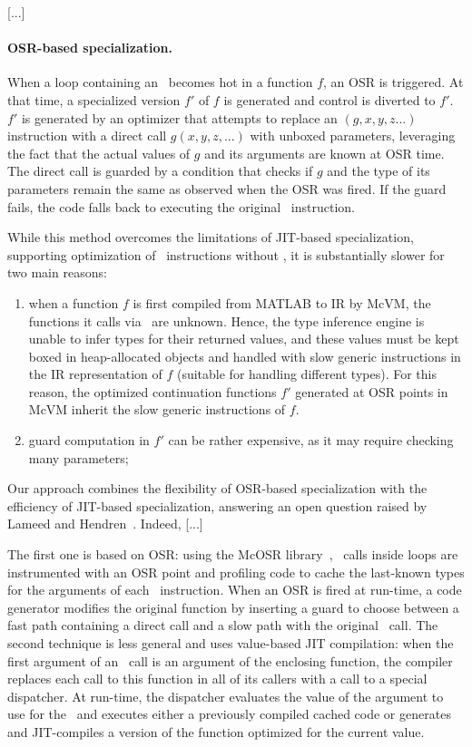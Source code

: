 [...]

\paragraph{OSR-based specialization.} When a loop containing an \feval\ becomes hot in a function $f$, an OSR is triggered. At that time, a specialized version $f'$ of $f$ is generated and control is diverted to $f'$. $f'$ is generated by an optimizer that attempts to replace an \feval$(g,x,y,z...)$ instruction with a direct call $g(x,y,z,...)$ with unboxed parameters, leveraging the fact that the actual values of $g$ and its arguments are known at OSR time. The direct call is guarded by a condition that checks if $g$ and the type of its parameters remain the same as observed when the OSR was fired. If the guard fails, the code falls back to executing the original \feval\ instruction.

While this method overcomes the limitations of JIT-based specialization, supporting optimization of \feval\ instructions without , it is substantially slower for two main reasons:
\begin{enumerate}
\item when a function $f$ is first compiled from MATLAB to IR by McVM, the functions it calls via \feval\ are unknown. Hence, the type inference engine is unable to infer types for their returned values, and these values must be kept boxed in heap-allocated objects and handled with slow generic instructions in the IR representation of $f$ (suitable for handling different types). For this reason, the optimized continuation functions $f'$ generated at OSR points in McVM inherit the slow generic instructions of $f$.
\item guard computation in $f'$ can be rather expensive, as it may require checking many parameters;
\end{enumerate}

\noindent Our approach combines the flexibility of OSR-based specialization with the efficiency of JIT-based specialization, answering an open question raised by Lameed and Hendren~\cite{lameed2013feval}. Indeed, [...]

\ifdefined\fullver
The first one is based on OSR: using the McOSR library~\cite{lameed2013modular}, \feval\ calls inside loops are instrumented with an OSR point and profiling code to cache the last-known types for the arguments of each \feval\ instruction. When an OSR is fired at run-time, a code generator modifies the original function by inserting a guard to choose between a fast path containing a direct call and a slow path with the original \feval\ call. The second technique is less general and uses value-based JIT compilation: when the first argument of an \feval\ call is an argument of the enclosing function, the compiler replaces each call to this function in all of its callers with a call to a special dispatcher. At run-time, the dispatcher evaluates the value of the argument to use for the \feval\ and executes either a previously compiled cached code or generates and JIT-compiles a version of the function optimized for the current value.

